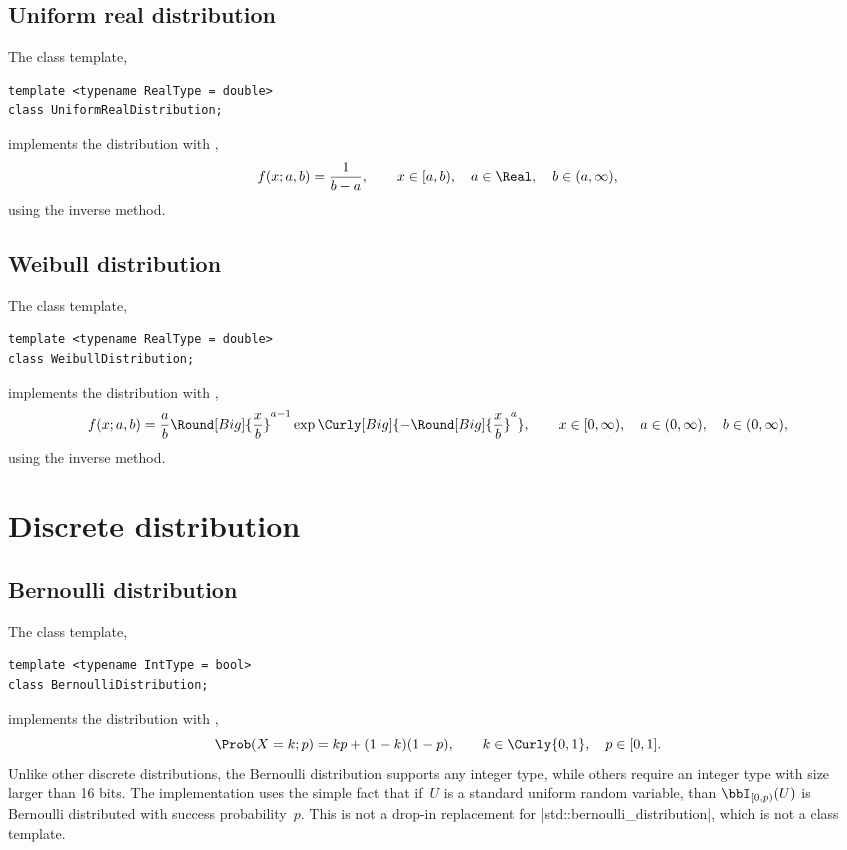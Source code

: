 \subsection{Uniform real distribution}
\label{sub:Uniform real distribution}

The class template,
\begin{verbatim}
template <typename RealType = double>
class UniformRealDistribution;
\end{verbatim}
implements the distribution with \pdf,
\begin{equation*}
  f(x;a,b) = \frac{1}{b - a},\qquad
  x \in [a, b),\quad a \in \Real,\quad b \in (a, \infty),
\end{equation*}
using the inverse method.

\subsection{Weibull distribution}
\label{sub:Weibull distribution}

The class template,
\begin{verbatim}
template <typename RealType = double>
class WeibullDistribution;
\end{verbatim}
implements the distribution with \pdf,
\begin{equation*}
  f(x;a,b) = \frac{a}{b}\Round[Big]{\frac{x}{b}}^{a - 1}
  \exp\Curly[Big]{-\Round[Big]{\frac{x}{b}}^a},\qquad
  x \in [0, \infty),\quad a \in (0, \infty),\quad b \in (0, \infty),
\end{equation*}
using the inverse method.

\section{Discrete distribution}
\label{sec:Discrete distribution}

\subsection{Bernoulli distribution}
\label{sub:Bernoulli distribution}

The class template,
\begin{verbatim}
template <typename IntType = bool>
class BernoulliDistribution;
\end{verbatim}
implements the distribution with \pdf,
\begin{equation*}
  \Prob(X = k;p) = kp + (1 - k)(1 - p),\qquad
  k \in \Curly{0, 1},\quad p \in [0, 1].
\end{equation*}
Unlike other discrete distributions, the Bernoulli distribution supports any
integer type, while others require an integer type with size larger than 16
bits. The implementation uses the simple fact that if~$U$ is a standard uniform
random variable, than $\bbI_{[0,p)}(U)$ is Bernoulli distributed with success
probability~$p$. This is not a drop-in replacement for
|std::bernoulli_distribution|, which is not a class template.

